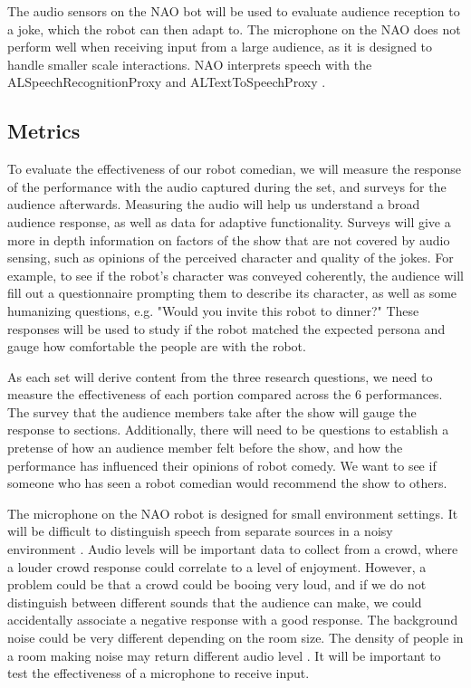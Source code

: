 \documentclass[onecolumn, draftclsnofoot,10pt, compsoc]{IEEEtran}
\begin{document}
The audio sensors on the NAO bot will be used to evaluate audience reception to a joke, which the robot can then adapt to. The microphone on the NAO does not perform well when receiving input from a large audience, as it is designed to handle smaller scale interactions. NAO interprets speech with the ALSpeechRecognitionProxy and ALTextToSpeechProxy \cite{audiodocs}.


\subsection{Metrics}

To evaluate the effectiveness of our robot comedian, we will measure the response of the performance with the audio captured during the set, and surveys for the audience afterwards. Measuring the audio will help us understand a broad audience response, as well as data for adaptive functionality. Surveys will give a more in depth information on factors of the show that are not covered by audio sensing, such as opinions of the perceived character and quality of the jokes. For example, to see if the robot's character was conveyed coherently, the audience will fill out a questionnaire prompting them to describe its character, as well as some humanizing questions, e.g. "Would you invite this robot to dinner?" These responses will be used to study if the robot matched the expected persona and gauge how comfortable the people are with the robot.


As each set will derive content from the three research questions, we need to measure the effectiveness of each portion compared across the 6 performances. The survey that the audience members take after the show will gauge the response to sections. Additionally, there will need to be questions to establish a pretense of how an audience member felt before the show, and how the performance has influenced their opinions of robot comedy. We want to see if someone who has seen a robot comedian would recommend the show to others.

The microphone on the NAO robot is designed for small environment settings. It will be difficult to distinguish speech from separate sources in a noisy environment \cite{alsounddetection}. Audio levels will be important data to collect from a crowd, where a louder crowd response could correlate to a level of enjoyment. However, a problem could be that a crowd could be booing very loud, and if we do not distinguish between different sounds that the audience can make, we could accidentally associate a negative response with a good response. The background noise could be very different depending on the room size. The density of people in a room making noise may return different audio level \cite{alsoundlocalization}. It will be important to test the effectiveness of a microphone to receive input.
\end{document}
